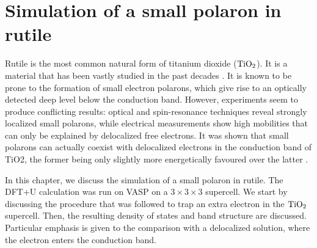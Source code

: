\chapter{Simulation of a small polaron in rutile} \label{ch:simulation}
Rutile is the most common natural form of titanium dioxide ($\ce{TiO_2}$). It is a material that has been vastly studied in the past decades \cite{franchini2021b}. It is known to be prone to the formation of small electron polarons, which give rise to an optically detected deep level below the conduction band. However, experiments seem to produce conflicting results: optical and spin-resonance techniques reveal strongly localized small polarons, while electrical measurements show high mobilities that can only be explained by delocalized free electrons. It was shown that small polarons can actually coexist with delocalized electrons in the conduction band of TiO2, the former being only slightly more energetically favoured over the latter \cite{janotti2013}.

In this chapter, we discuss the simulation of a small polaron in rutile. The DFT+U calculation was run on VASP on a $3\times3\times3$ supercell. We start by discussing the procedure that was followed to trap an extra electron in the $\ce{TiO_2}$ supercell. Then, the resulting density of states and band structure are discussed. Particular emphasis is given to the comparison with a delocalized solution, where the electron enters the conduction band.



